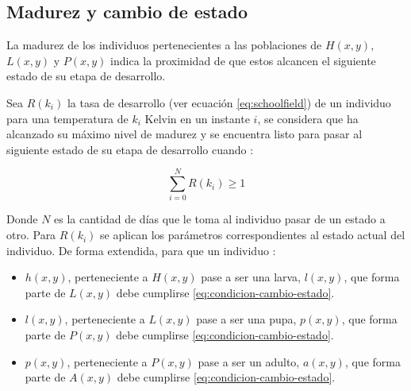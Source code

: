 \subsection{Madurez y cambio de estado}
\label{subsec:cap4-madurez-cambio-estado}
La madurez de los individuos pertenecientes a las poblaciones de $H(x,y)$, $L(x,y)$ y $P(x,y)$
indica la proximidad de que estos alcancen el siguiente estado de su etapa de desarrollo.

Sea $R(k_{i})$ la tasa de desarrollo (ver ecuación \eqref{eq:schoolfield}) de un individuo para
una temperatura de $k_{i}$ Kelvin en un instante $i$, se considera que ha alcanzado su máximo nivel
de madurez y se encuentra listo para pasar al siguiente estado de su etapa de desarrollo cuando :

\begin{equation}
\label{eq:condicion-cambio-estado}
    \sum_{i=0}^{N} R(k_{i}) \geq 1
\end{equation}

Donde $N$ es la cantidad de días que le toma al individuo pasar de un estado a otro. Para
$R(k_{i})$ se aplican los parámetros correspondientes al estado actual del individuo. De forma
extendida, para que un individuo :

\begin{itemize}
\item $h(x,y)$, perteneciente a $H(x,y)$ pase a ser una larva, $l(x,y)$, que forma parte de $L(x,y)$ debe cumplirse \eqref{eq:condicion-cambio-estado}.

\item $l(x,y)$, perteneciente a $L(x,y)$ pase a ser una pupa, $p(x,y)$, que forma parte de $P(x,y)$ debe cumplirse \eqref{eq:condicion-cambio-estado}.

\item $p(x,y)$, perteneciente a $P(x,y)$ pase a ser un adulto, $a(x,y)$, que forma parte de $A(x,y)$ debe cumplirse \eqref{eq:condicion-cambio-estado}.
\end{itemize}




